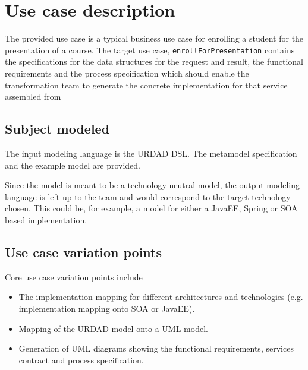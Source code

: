 \section{Use case description}

The provided use case is a typical business use case for enrolling a student for the presentation of a course. The target use case,
\verb+enrollForPresentation+ contains the specifications for the data structures for the request and result, the functional requirements
and the process specification which should enable the transformation team to generate the concrete implementation for that service
assembled from

\subsection{Subject modeled}

The input modeling language is the URDAD DSL. The metamodel specification and the example model are provided.

Since the model is meant to be a technology neutral model, the output modeling language is left up to the team and would correspond to the target technology chosen. This could be, for example, a model for either a JavaEE, Spring or SOA based implementation.

\subsection{Use case variation points}
Core use case variation points include
\begin{itemize}
  \item The implementation mapping for different architectures and technologies (e.g. implementation mapping onto SOA or JavaEE).
  \item Mapping of the URDAD model onto a UML model.
  \item Generation of UML diagrams showing the functional requirements, services contract and process specification.
\end{itemize}
